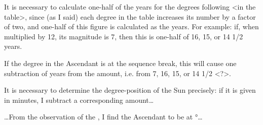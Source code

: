 It is necessary to calculate one-half of the years for the degrees following <in the table>, since (as I said) each degree in the table increases its number by a factor of two, and one-half of this figure is calculated as the years. For example: if, when multiplied by 12, its magnitude is 7, then this is one-half of 16, 15, or 14 1/2 years. 

If the degree in the Ascendant is at the sequence break, this will cause one subtraction of years from the amount, i.e. from 7, 16, 15, or 14 1/2 <?>.

It is necessary to determine the degree-position of the Sun precisely: if it is given in minutes, I subtract a corresponding amount…

…From the observation of the \Sun, I find the Ascendant to be at °…

\newpage